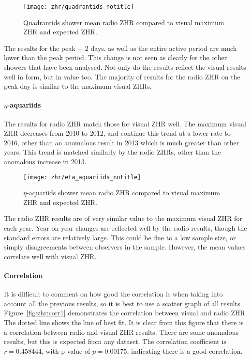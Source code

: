 \begin{figure}[h!] 
	\centering
	\texttt{[image: zhr/quadrantids\_notitle]} 
	\caption{Quadrantids shower mean radio ZHR compared to visual maximum ZHR
	and expected ZHR.}
	\label{fig:zhr:qua}	
\end{figure}

The results for the peak $\pm$ 2 days, as well as the entire active period are
much lower than the peak period. This change is not seen as clearly for the
other showers that have been analysed. Not only do the results reflect the
visual results well in form, but in value too. The majority of results for
the radio ZHR on the peak day is similar to the maximum visual ZHRs.

\paragraph{$\eta$-aquariids\\}

The results for radio ZHR match those for visual ZHR well. The maximum visual
ZHR decreases from 2010 to 2012, and continue this trend at a lower rate to
2016, other than an anomalous result in 2013 which is much greater than other
years. This trend is matched similarly by the radio ZHRs, other than the
anomalous increase in 2013. 

\begin{figure}[h!] 
	\centering
	\texttt{[image: zhr/eta\_aquariids\_notitle]}
	\caption{$\eta$-aquariids shower mean radio ZHR compared to visual maximum
	ZHR and expected ZHR.} 
	\label{fig:zhr:eaq}	
\end{figure}

The radio ZHR results are of very similar value to the maximum visual ZHR for
each year. Year on year changes are reflected well by the radio results, though
the standard errors are relatively large. This could be due to a low sample
size, or simply disagreements between observers in the sample. However, the
mean values correlate well with visual ZHR.

\paragraph{Correlation}

It is difficult to comment on how good the correlation is when taking into
account all the previous results, so it is best to use a scatter graph of all
results. Figure~\ref{fig:zhr:corr1} demonstrates the correlation between visual
and radio ZHR. The dotted line shows the line of best fit. It is clear from this
figure that there is a correlation between radio and visual ZHR results. There
are some anomalous results, but this is expected from any dataset. The
correlation coefficient is $r = 0.458444$, with p-value of $p = 0.00175$,
indicating there is a good correlation.


